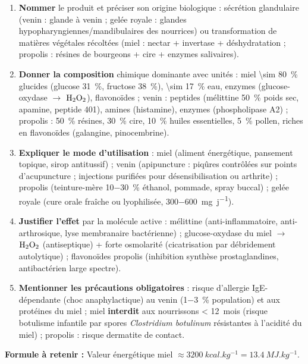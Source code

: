 \documentclass[11pt]{article}
\begin{document}
\begin{methode}
\begin{enumerate}
\item \textbf{Nommer} le produit et préciser son origine biologique : sécrétion glandulaire (venin : glande à venin ; gelée royale : glandes hypopharyngiennes/mandibulaires des nourrices) ou transformation de matières végétales récoltées (miel : nectar + invertase + déshydratation ; propolis : résines de bourgeons + cire + enzymes salivaires).
\item \textbf{Donner la composition} chimique dominante avec unités : miel \SI{\sim 80}{\percent} glucides (glucose \SI{31}{\percent}, fructose \SI{38}{\percent}), \SI{\sim 17}{\percent} eau, enzymes (glucose-oxydase $\rightarrow$ $\ce{H2O2}$), flavonoïdes ; venin : peptides (mélittine \SI{50}{\percent} poids sec, apamine, peptide 401), amines (histamine), enzymes (phospholipase A2) ; propolis : \SI{50}{\percent} résines, \SI{30}{\percent} cire, \SI{10}{\percent} huiles essentielles, \SI{5}{\percent} pollen, riches en flavonoïdes (galangine, pinocembrine).
\item \textbf{Expliquer le mode d'utilisation} : miel (aliment énergétique, pansement topique, sirop antitussif) ; venin (apipuncture : piqûres contrôlées sur points d'acupuncture ; injections purifiées pour désensibilisation ou arthrite) ; propolis (teinture-mère \SI{10-30}{\percent} éthanol, pommade, spray buccal) ; gelée royale (cure orale fraîche ou lyophilisée, \SI{300-600}{mg.j^{-1}}).
\item \textbf{Justifier l'effet} par la molécule active : mélittine (anti-inflammatoire, anti-arthrosique, lyse membranaire bactérienne) ; glucose-oxydase du miel $\rightarrow$ $\ce{H2O2}$ (antiseptique) + forte osmolarité (cicatrisation par débridement autolytique) ; flavonoïdes propolis (inhibition synthèse prostaglandines, antibactérien large spectre).
\item \textbf{Mentionner les précautions obligatoires} : risque d'allergie IgE-dépendante (choc anaphylactique) au venin (\SI{1-3}{\percent} population) et aux protéines du miel ; miel \textbf{interdit} aux nourrissons \SI{< 12}{mois} (risque botulisme infantile par spores \emph{Clostridium botulinum} résistantes à l'acidité du miel) ; propolis : risque dermatite de contact.
\end{enumerate}
\textbf{Formule à retenir :} Valeur énergétique miel $\approx \SI{3200}{kcal.kg^{-1}} = \SI{13,4}{MJ.kg^{-1}}$.
\end{methode}
\end{document}
